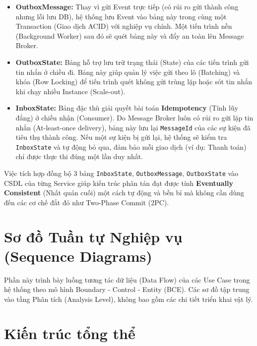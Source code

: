 \begin{itemize}
  \item \textbf{OutboxMessage:} Thay vì gửi Event trực tiếp (có rủi ro gửi thành công nhưng lỗi lưu DB), hệ thống lưu Event vào bảng này trong cùng một Transaction (Giao dịch ACID) với nghiệp vụ chính. Một tiến trình nền (Background Worker) sau đó sẽ quét bảng này và đẩy an toàn lên Message Broker.
  \item \textbf{OutboxState:} Bảng hỗ trợ lưu trữ trạng thái (State) của các tiến trình gửi tin nhắn ở chiều đi. Bảng này giúp quản lý việc gửi theo lô (Batching) và khóa (Row Locking) để tiến trình quét không gửi trùng lặp hoặc sót tin nhắn khi chạy nhiều Instance (Scale-out).
  \item \textbf{InboxState:} Bảng đặc thù giải quyết bài toán \textbf{Idempotency} (Tính lũy đẳng) ở chiều nhận (Consumer). Do Message Broker luôn có rủi ro gửi lặp tin nhắn (At-least-once delivery), bảng này lưu lại \texttt{MessageId} của các sự kiện đã tiêu thụ thành công. Nếu một sự kiện bị gửi lại, hệ thống sẽ kiểm tra \texttt{InboxState} và tự động bỏ qua, đảm bảo mỗi giao dịch (ví dụ: Thanh toán) chỉ được thực thi đúng một lần duy nhất.
\end{itemize}

Việc tích hợp đồng bộ 3 bảng \texttt{InboxState}, \texttt{OutboxMessage}, \texttt{OutboxState} vào CSDL của từng Service giúp kiến trúc phân tán đạt được tính \textbf{Eventually Consistent} (Nhất quán cuối) một cách tự động và bền bỉ mà không cần dùng đến các cơ chế đắt đỏ như Two-Phase Commit (2PC).

\section{Sơ đồ Tuần tự Nghiệp vụ (Sequence Diagrams)}
\label{sec:sequence_diagrams}
Phần này trình bày luồng tương tác dữ liệu (Data Flow) của các Use Case trong hệ thống theo mô hình Boundary - Control - Entity (BCE). Các sơ đồ tập trung vào tầng Phân tích (Analysis Level), không bao gồm các chi tiết triển khai vật lý.



\section{Kiến trúc tổng thể}
\label{sec:kien_truc}

